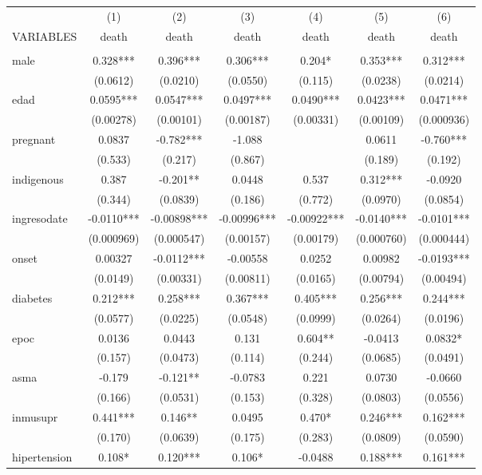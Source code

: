 \documentclass[]{article}
\begin{document}
\begin{tabular}{lcccccc} \hline
 & (1) & (2) & (3) & (4) & (5) & (6) \\
VARIABLES & death & death & death & death & death & death \\ \hline
 &  &  &  &  &  &  \\
male & 0.328*** & 0.396*** & 0.306*** & 0.204* & 0.353*** & 0.312*** \\
 & (0.0612) & (0.0210) & (0.0550) & (0.115) & (0.0238) & (0.0214) \\
edad & 0.0595*** & 0.0547*** & 0.0497*** & 0.0490*** & 0.0423*** & 0.0471*** \\
 & (0.00278) & (0.00101) & (0.00187) & (0.00331) & (0.00109) & (0.000936) \\
pregnant & 0.0837 & -0.782*** & -1.088 &  & 0.0611 & -0.760*** \\
 & (0.533) & (0.217) & (0.867) &  & (0.189) & (0.192) \\
indigenous & 0.387 & -0.201** & 0.0448 & 0.537 & 0.312*** & -0.0920 \\
 & (0.344) & (0.0839) & (0.186) & (0.772) & (0.0970) & (0.0854) \\
ingresodate & -0.0110*** & -0.00898*** & -0.00996*** & -0.00922*** & -0.0140*** & -0.0101*** \\
 & (0.000969) & (0.000547) & (0.00157) & (0.00179) & (0.000760) & (0.000444) \\
onset & 0.00327 & -0.0112*** & -0.00558 & 0.0252 & 0.00982 & -0.0193*** \\
 & (0.0149) & (0.00331) & (0.00811) & (0.0165) & (0.00794) & (0.00494) \\
diabetes & 0.212*** & 0.258*** & 0.367*** & 0.405*** & 0.256*** & 0.244*** \\
 & (0.0577) & (0.0225) & (0.0548) & (0.0999) & (0.0264) & (0.0196) \\
epoc & 0.0136 & 0.0443 & 0.131 & 0.604** & -0.0413 & 0.0832* \\
 & (0.157) & (0.0473) & (0.114) & (0.244) & (0.0685) & (0.0491) \\
asma & -0.179 & -0.121** & -0.0783 & 0.221 & 0.0730 & -0.0660 \\
 & (0.166) & (0.0531) & (0.153) & (0.328) & (0.0803) & (0.0556) \\
inmusupr & 0.441*** & 0.146** & 0.0495 & 0.470* & 0.246*** & 0.162*** \\
 & (0.170) & (0.0639) & (0.175) & (0.283) & (0.0809) & (0.0590) \\
hipertension & 0.108* & 0.120*** & 0.106* & -0.0488 & 0.188*** & 0.161*** \\

\end{tabular}
\end{document}
